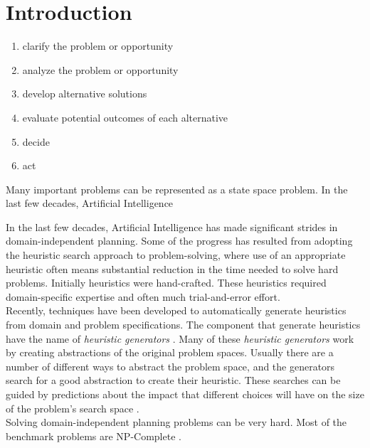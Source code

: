\documentclass[a4paper,12pt]{article}
\begin{document}
\tableofcontents
\newpage

\section{Introduction}

\begin{enumerate}
\item clarify the problem or opportunity
\item analyze the problem or opportunity
\item develop alternative solutions
\item evaluate potential outcomes of each alternative
\item decide
\item act
\end{enumerate}



Many important problems can be represented as a state space problem. In the last few decades, Artificial Intelligence 


In the last few decades, Artificial Intelligence has made significant strides in domain-independent planning. Some of the progress has resulted from adopting the heuristic search approach to problem-solving, where use of an appropriate heuristic often means substantial reduction in the time needed to solve hard problems. Initially heuristics were hand-crafted. These heuristics required domain-specific expertise and often much trial-and-error effort.\\

Recently, techniques \citep{haslum2007domain, edelkamp2007automated, nissim2011computing}  have been developed to automatically generate heuristics from domain and problem specifications. The component that generate heuristics have the name of \textit{heuristic generators} \citep{BarleySantiagoOver}.  Many of these \textit{heuristic generators} work by creating abstractions of the original problem spaces. Usually there are a number of different ways to abstract the problem space, and the generators search for a good abstraction to create their heuristic. These searches can be guided by predictions about the impact that different choices will have on the size of the problem's search space \citep{haslum2007domain}.\\

Solving domain-independent planning problems can be very hard. Most of the benchmark problems are NP-Complete \citep{helmert2006fast}.\\
\end{document}
